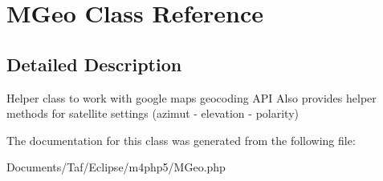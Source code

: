 \hypertarget{classMGeo}{
\section{MGeo Class Reference}
\label{classMGeo}
}


\subsection{Detailed Description}
Helper class to work with google maps geocoding API Also provides helper methods for satellite settings (azimut - elevation - polarity) 

The documentation for this class was generated from the following file:\begin{CompactItemize}
\item 
Documents/Taf/Eclipse/m4php5/MGeo.php\end{CompactItemize}
